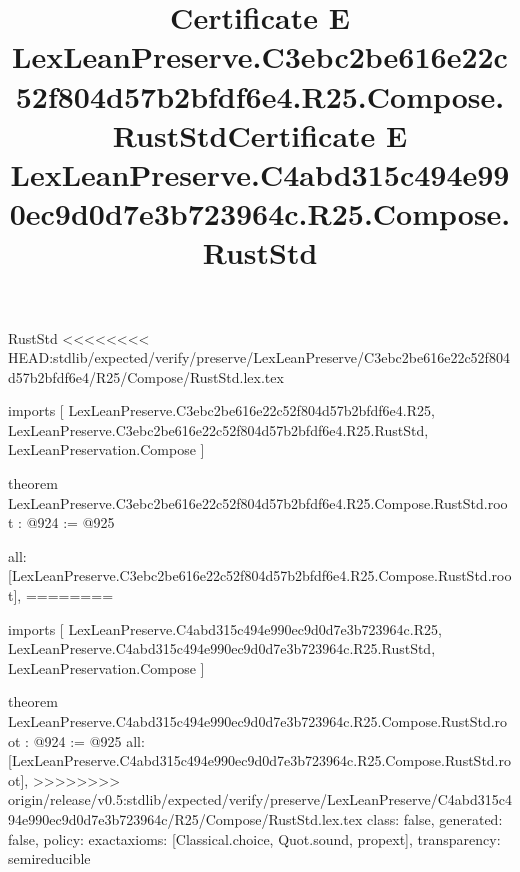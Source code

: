 \begin{lexlean}{RustStd}
<<<<<<<< HEAD:stdlib/expected/verify/preserve/LexLeanPreserve/C3ebc2be616e22c52f804d57b2bfdf6e4/R25/Compose/RustStd.lex.tex
\title{Certificate E LexLeanPreserve.C3ebc2be616e22c52f804d57b2bfdf6e4.R25.Compose.RustStd}
\begin{coremodule}
imports [
  LexLeanPreserve.C3ebc2be616e22c52f804d57b2bfdf6e4.R25,
  LexLeanPreserve.C3ebc2be616e22c52f804d57b2bfdf6e4.R25.RustStd,
  LexLeanPreservation.Compose
]

theorem LexLeanPreserve.C3ebc2be616e22c52f804d57b2bfdf6e4.R25.Compose.RustStd.root : @924 := @925 {
  all: [LexLeanPreserve.C3ebc2be616e22c52f804d57b2bfdf6e4.R25.Compose.RustStd.root],
========
\title{Certificate E LexLeanPreserve.C4abd315c494e990ec9d0d7e3b723964c.R25.Compose.RustStd}
\begin{coremodule}
imports [
  LexLeanPreserve.C4abd315c494e990ec9d0d7e3b723964c.R25,
  LexLeanPreserve.C4abd315c494e990ec9d0d7e3b723964c.R25.RustStd,
  LexLeanPreservation.Compose
]

theorem LexLeanPreserve.C4abd315c494e990ec9d0d7e3b723964c.R25.Compose.RustStd.root : @924 := @925 {
  all: [LexLeanPreserve.C4abd315c494e990ec9d0d7e3b723964c.R25.Compose.RustStd.root],
>>>>>>>> origin/release/v0.5:stdlib/expected/verify/preserve/LexLeanPreserve/C4abd315c494e990ec9d0d7e3b723964c/R25/Compose/RustStd.lex.tex
  class: false,
  generated: false,
  policy: exact{axioms: [Classical.choice, Quot.sound, propext]},
  transparency: semireducible
}


\end{coremodule}}
\end{coremodule}
\end{lexlean}
